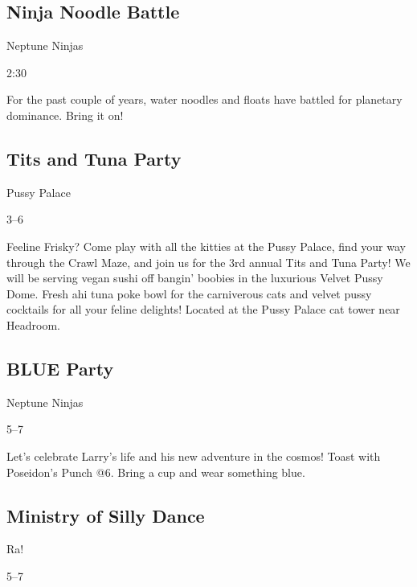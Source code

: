 \begin{multicols}{2}
\subsection*{Ninja Noodle Battle}
\begin{description}[leftmargin=6em,noitemsep,style=nextline]
	\item[Camp:] Neptune Ninjas
  \item[Times:] 2:30\pm
\end{description}

For the past couple of years, water noodles and floats have battled for planetary dominance. Bring it on!

\subsection*{Tits and Tuna Party}
\begin{description}[leftmargin=6em,noitemsep,style=nextline]
	\item[Camp:] Pussy Palace
    \item[Times:] 3--6\pm
\end{description}

Feeline Frisky? Come play with all the kitties at the Pussy Palace, find your way through the Crawl Maze, and join us for the 3rd annual Tits and Tuna Party! We will be serving vegan sushi off bangin' boobies in the luxurious Velvet Pussy Dome. Fresh ahi tuna poke bowl for the carniverous cats and velvet pussy cocktails for all your feline delights!  Located at the Pussy Palace cat tower near Headroom. 

\subsection*{BLUE Party}
\begin{description}[leftmargin=6em,noitemsep,style=nextline]
	\item[Camp:] Neptune Ninjas
  \item[Times:] 5--7\pm
\end{description}

Let’s celebrate Larry’s life and his new adventure in the cosmos! Toast with Poseidon’s Punch @6.  Bring a cup and wear something blue.

\subsection*{Ministry of Silly Dance}
\begin{description}[leftmargin=6em,noitemsep,style=nextline]
	\item[Camp:] Ra!
    \item[Times:] 5--7\pm
\end{description}


\end{multicols}
